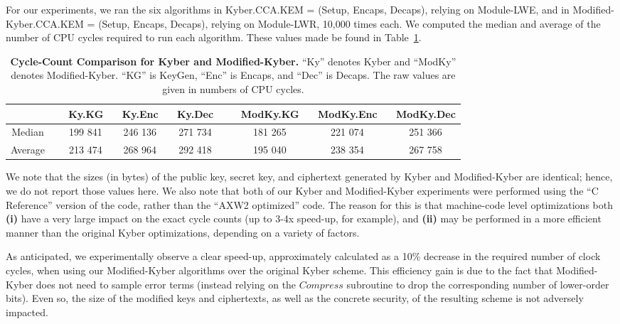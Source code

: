 For our experiments, we ran the six algorithms in Kyber.CCA.KEM = (Setup, Encaps, Decaps), relying on Module-LWE, and in Modified-Kyber.CCA.KEM = (Setup, Encaps, Decaps), relying on Module-LWR, 10,000 times each. We computed the median and average of the number of CPU cycles required to run each algorithm. These values made be found in Table~\ref{tab:kyber}.

\begin{table}[!hb]
\begin{center}
\begin{tabular}{ c | c  c  c | c  c  c }
\hline
 & \,\,\, Ky.KG & \,\,\, Ky.Enc & \,\,\, Ky.Dec \,\,\, & \,\,\, ModKy.KG & \,\,\, ModKy.Enc & \,\,\, ModKy.Dec \\
\hline
Median\,\,\, & \,\,\,\,\,199 841 & \,\,\, 246 136 & \,\,\, 271 734 \,\,\, & \,\,\, 181 265 & \,\,\, 221 074 & \,\,\, 251 366 \\
Average\,\,\, & \,\,\, 213 474 & \,\,\, 268 964 & \,\,\, 292 418 \,\,\, & \,\,\, 195 040 & \,\,\, 238 354 & \,\,\, 267 758 \\
\hline
\end{tabular}
\end{center}
\caption{{\bf Cycle-Count Comparison for Kyber and Modified-Kyber.} ``Ky'' denotes Kyber and ``ModKy'' denotes Modified-Kyber. ``KG'' is KeyGen, ``Enc'' is Encaps, and ``Dec'' is Decaps. The raw values are given in numbers of CPU cycles.}\label{tab:kyber}
\end{table}

We note that the sizes (in bytes) of the public key, secret key, and ciphertext generated by Kyber and Modified-Kyber are identical; hence, we do not report those values here. We also note that both of our Kyber and Modified-Kyber experiments were performed using the ``C Reference'' version of the code, rather than the ``AXW2 optimized'' code. The reason for this is that machine-code level optimizations both {\bf (i)} have a very large impact on the exact cycle counts (up to 3-4x speed-up, for example), and {\bf (ii)} may be performed in a more efficient manner than the original Kyber optimizations, depending on a variety of factors.

As anticipated, we experimentally observe a clear speed-up, approximately calculated as a 10\%  decrease in the required number of clock cycles, when using our Modified-Kyber algorithms over the original Kyber scheme. This efficiency gain is due to the fact that Modified-Kyber does not need to sample error terms (instead relying on the $Compress$ subroutine to drop the corresponding number of lower-order bits). Even so, the size of the modified keys and ciphertexts, as well as the concrete security, of the resulting scheme is not adversely impacted.


